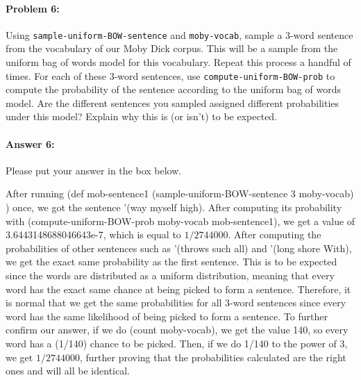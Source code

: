 \documentclass[10pt]{article}
\newenvironment{AnswerBox}{\begin{mdframed}[style=simple]}{\end{mdframed}}
\begin{document}
\paragraph{Problem 6:}

Using \texttt{sample-uniform-BOW-sentence} and \texttt{moby-vocab}, sample a
3-word sentence from the vocabulary of our Moby Dick corpus. This will be a
sample from the uniform bag of words model for this vocabulary. Repeat this
process a handful of times. For each of these 3-word sentences, use
\texttt{compute-uniform-BOW-prob} to compute the probability of the sentence
according to the uniform bag of words model. Are the different sentences you
sampled assigned different probabilities under this model? Explain why this is
(or isn't) to be expected.

\paragraph{Answer 6:} Please put your answer in the box below.

\begin{AnswerBox}%


    After running (def mob-sentence1 (sample-uniform-BOW-sentence 3 moby-vocab) ) once, we got the sentence '(way myself high). After computing its probability with (compute-uniform-BOW-prob moby-vocab mob-sentence1), we get a value of 3.6443148688046643e-7, which is equal to $1/2744000$. After computing the probabilities of other sentences such as '(throws such all) and '(long shore With), we get the exact same probability as the first sentence. This is to be expected since the words are distributed as a uniform distribution, meaning that every word has the exact same chance at being picked to form a sentence. Therefore, it is normal that we get the same probabilities for all 3-word sentences since every word has the same likelihood of being picked to form a sentence. To further confirm our answer, if we do (count moby-vocab), we get the value 140, so every word has a (1/140) chance to be picked. Then, if we do 1/140 to the power of 3, we get $1/2744000$, further proving that the probabilities calculated are the right ones and will all be identical.

\end{AnswerBox}%

\hrulefill %
\end{document}
